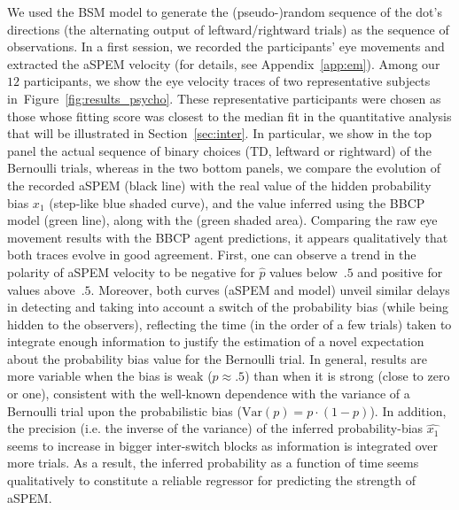 \documentclass[12pt,english]{article}%
\newcommand{\seeFig}[1]{Figure~\ref{fig:#1}}
\newcommand{\seeApp}[1]{Appendix~\ref{app:#1}}
\newcommand{\seeSec}[1]{Section~\ref{sec:#1}}
\begin{document}
We used the BSM model to generate the (pseudo-)random sequence of
the dot's directions (the alternating output of leftward/rightward trials)
as the sequence of observations.
In a first session, we recorded the participants' eye movements and
extracted the aSPEM velocity (for details, see \seeApp{em}).
Among our $12$ participants, we show the eye velocity traces of two representative subjects in~\seeFig{results_psycho}.
These representative participants were chosen as those
whose fitting score was closest to the median fit in the quantitative analysis
that will be illustrated in \seeSec{inter}.
In particular, we show in the top panel the actual sequence of binary choices
(TD, leftward or rightward) of the Bernoulli trials, whereas in the two bottom panels, we compare the evolution of the recorded aSPEM (black line) with
the real value of the hidden probability bias $x_1$ (step-like blue shaded curve),
and the value inferred using the BBCP model (green line), along with the  (green shaded area).
Comparing the raw eye movement results with the BBCP agent predictions,
it appears qualitatively that both traces evolve in good agreement.
First, one can observe a trend in the polarity of aSPEM velocity
to be negative for $\hat{p}$ values below~$.5$ and positive for values above~$.5$.
Moreover, both curves (aSPEM and model) unveil similar delays in detecting and 
taking into account a switch of the probability bias (while being hidden to the observers),
reflecting the time (in the order of a few trials) taken to integrate enough information
to justify the estimation of a novel expectation about the probability bias value for the Bernoulli trial.
In general, results are more variable when the bias is weak ($p\approx .5$)
than when it is strong (close to zero or one),
consistent with the well-known dependence with the variance of a Bernoulli trial
upon the probabilistic bias ($\textrm{Var}(p)= p \cdot (1-p)$).
In addition, the precision (i.e. the inverse of the variance)
of the inferred probability-bias $\hat{x_1}$ seems to increase
in bigger inter-switch blocks as information is integrated over more trials.
As a result, the inferred probability as a function of time
seems qualitatively to constitute a reliable regressor
for predicting the strength of aSPEM.
\end{document}
